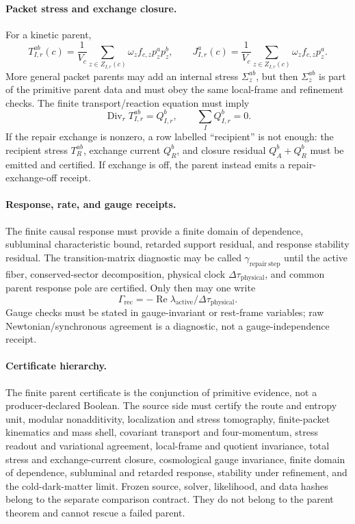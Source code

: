 \paragraph{Packet stress and exchange closure.}
For a kinetic parent,
\[
T_{I,r}^{ab}(c)=
\frac{1}{V_c}\sum_{z\in Z_{I,r}(c)}\omega_zf_{c,z}p_z^ap_z^b ,
\qquad
J_{I,r}^a(c)=
\frac{1}{V_c}\sum_{z\in Z_{I,r}(c)}\omega_zf_{c,z}p_z^a .
\]
More general packet parents may add an internal stress \(\Sigma_z^{ab}\), but
then \(\Sigma_z^{ab}\) is part of the primitive parent data and must obey the
same local-frame and refinement checks.  The finite transport/reaction equation
must imply
\[
\operatorname{Div}_r T_{I,r}^{ab}=Q_{I,r}^b,\qquad
\sum_I Q_{I,r}^b=0.
\]
If the repair exchange is nonzero, a row labelled ``recipient'' is not enough:
the recipient stress \(T_R^{ab}\), exchange current \(Q_R^b\), and closure
residual \(Q_A^b+Q_R^b\) must be emitted and certified.  If exchange is off,
the parent instead emits a repair-exchange-off receipt.

\paragraph{Response, rate, and gauge receipts.}
The finite causal response must provide a finite domain of dependence,
subluminal characteristic bound, retarded support residual, and response
stability residual.  The transition-matrix diagnostic may be called
\(\gamma_{\mathrm{repair\ step}}\) until the active fiber, conserved-sector
decomposition, physical clock \(\Delta\tau_{\mathrm{physical}}\), and common
parent response pole are certified.  Only then may one write
\[
\Gamma_{\mathrm{rec}}=
-\operatorname{Re}\lambda_{\mathrm{active}}/\Delta\tau_{\mathrm{physical}} .
\]
Gauge checks must be stated in gauge-invariant or rest-frame variables; raw
Newtonian\slash synchronous agreement is a diagnostic, not a gauge-independence
receipt.

\paragraph{Certificate hierarchy.}
The finite parent certificate is the conjunction of primitive evidence, not a
producer-declared Boolean. The source side must certify the route and entropy
unit, modular nonadditivity, localization and stress tomography, finite-packet
kinematics and mass shell, covariant transport and four-momentum, stress
readout and variational agreement, local-frame and quotient invariance, total
stress and exchange-current closure, cosmological gauge invariance, finite
domain of dependence, subluminal and retarded response, stability under
refinement, and the cold-dark-matter limit.
Frozen source, solver, likelihood, and data hashes belong to the separate
comparison contract. They do not belong to the parent theorem and cannot
rescue a failed parent.
